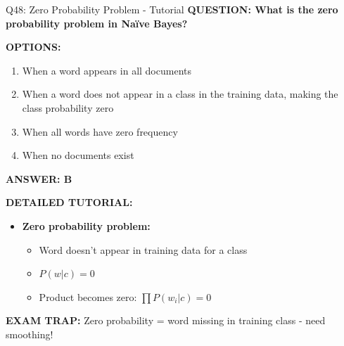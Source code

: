 \documentclass[8pt]{beamer}
\begin{document}
	\begin{frame}{Q48: Zero Probability Problem - Tutorial}
		\fontsize{6.5}{7.5}\selectfont
		\textbf{QUESTION: What is the zero probability problem in Naïve Bayes?}
		
		\vspace{0.1cm}
		\textbf{OPTIONS:}
		\begin{enumerate}
			\item When a word appears in all documents
			\item When a word does not appear in a class in the training data, making the class probability zero
			\item When all words have zero frequency
			\item When no documents exist
		\end{enumerate}
		
		\vspace{0.1cm}
		\textcolor{myblue}{\textbf{ANSWER: B}}
		
		\vspace{0.1cm}
		\textbf{DETAILED TUTORIAL:}
		\begin{itemize}
			\item \textbf{Zero probability problem:}
			\begin{itemize}
				\item Word doesn't appear in training data for a class
				\item $P(w|c) = 0$
				\item Product becomes zero: $\prod P(w_i|c) = 0$
			\end{itemize}
		\end{itemize}
		
		\textcolor{myred}{\textbf{EXAM TRAP:}} Zero probability = \textcolor{myblue}{word missing in training class} - need smoothing!
	\end{frame}
	
\end{document}

